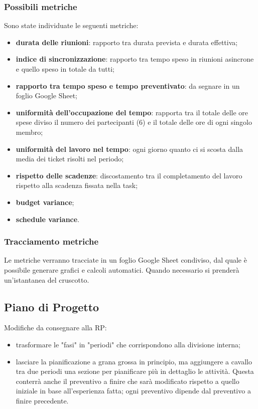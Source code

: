 \subsubsection{Possibili metriche}
Sono state individuate le seguenti metriche:
\begin{itemize}
	\item \textbf{durata delle riunioni}: rapporto tra durata prevista e durata effettiva;
	\item \textbf{indice di sincronizzazione}: rapporto tra tempo speso in riunioni asincrone e quello speso in totale da tutti;
	\item \textbf{rapporto tra tempo speso e tempo preventivato}: da segnare in un foglio Google Sheet;
	\item \textbf{uniformità dell'occupazione del tempo}: rapporta tra il totale delle ore spese diviso il numero dei partecipanti (6) e il totale delle ore di ogni singolo membro;
	\item \textbf{uniformità del lavoro nel tempo}: ogni giorno quanto ci si scosta dalla media dei ticket risolti nel periodo;
	\item \textbf{rispetto delle scadenze}: discostamento tra il completamento del lavoro rispetto alla scadenza fissata nella task;
	\item \textbf{budget variance};
	\item \textbf{schedule variance}.
\end{itemize}
\subsubsection{Tracciamento metriche}
Le metriche verranno tracciate in un foglio Google Sheet condiviso, dal quale è possibile generare grafici e calcoli automatici. Quando necessario si prenderà un'istantanea del cruscotto.

\subsection{Piano di Progetto}
Modifiche da consegnare alla RP:
\begin{itemize}
	\item trasformare le "fasi" in "periodi" che corrispondono alla divisione interna;
	\item lasciare la pianificazione a grana grossa in principio, ma aggiungere a cavallo tra due periodi una sezione per pianificare più in dettaglio le attività. Questa conterrà anche il preventivo a finire che sarà modificato rispetto a quello iniziale in base all'esperienza fatta; ogni preventivo dipende dal preventivo a finire precedente.
\end{itemize}

